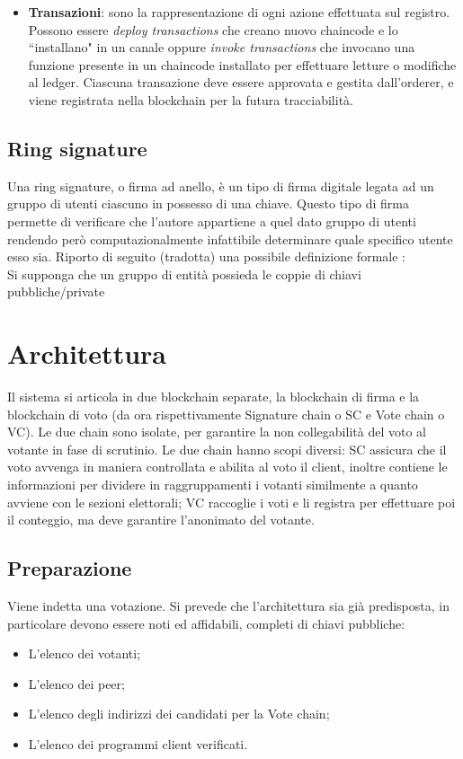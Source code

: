 \begin{itemize}
				\item \textbf{Transazioni}: sono la rappresentazione di ogni azione effettuata sul registro. Possono essere \emph{deploy transactions} che creano nuovo chaincode e lo ``installano" in un canale oppure \emph{invoke transactions} che invocano una funzione presente in un chaincode installato per effettuare letture o modifiche al ledger. Ciascuna transazione deve essere approvata e gestita dall'orderer, e viene registrata nella blockchain per la futura tracciabilità.
			\end{itemize}
		
	\subsection{Ring signature}
		Una ring signature, o firma ad anello, è un tipo di firma digitale legata ad un gruppo di utenti ciascuno in possesso di una chiave. Questo tipo di firma permette di verificare che l'autore appartiene a quel dato gruppo di utenti rendendo però computazionalmente infattibile determinare quale specifico utente esso sia. Riporto di seguito (tradotta) una possibile definizione formale \cite{ring_signature}: \\
		Si supponga che un gruppo di entità possieda le coppie di chiavi pubbliche/private 


\section{Architettura}
	Il sistema si articola in due blockchain separate, la blockchain di firma e la blockchain di voto (da ora rispettivamente Signature chain o SC e Vote chain o VC). Le due chain sono isolate, per garantire la non collegabilità del voto al votante in fase di scrutinio.
	Le due chain hanno scopi diversi: SC assicura che il voto avvenga in maniera controllata e abilita al voto il client, inoltre contiene le informazioni per dividere in raggruppamenti i votanti similmente a quanto avviene con le sezioni elettorali; VC raccoglie i voti e li registra per effettuare poi il conteggio, ma deve garantire l’anonimato del votante.
	
	\subsection{Preparazione}
		Viene indetta una votazione. Si prevede che l'architettura sia già predisposta, in particolare devono essere noti ed affidabili, completi di chiavi pubbliche:
		\begin{itemize}
			\item L'elenco dei votanti;
			\item L'elenco dei peer;
			\item L'elenco degli indirizzi dei candidati per la Vote chain;
			\item L'elenco dei programmi client verificati.
		\end{itemize}
